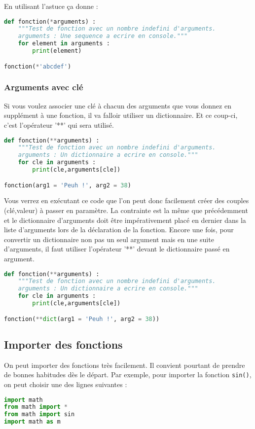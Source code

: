 \documentclass[a4paper,twoside]{article}
\begin{document}
En utilisant l'astuce  ça donne :
\begin{lstlisting}[language=python]
def fonction(*arguments) :
    """Test de fonction avec un nombre indefini d'arguments.
    arguments : Une sequence a ecrire en console."""
    for element in arguments :
        print(element)

fonction(*'abcdef')
\end{lstlisting}

\subsubsection{Arguments avec clé}

Si vous voulez associer une clé à chacun des arguments que vous donnez en supplément à une fonction, il va falloir utiliser un dictionnaire. Et ce coup-ci, c'est l'opérateur '**' qui sera utilisé.

\begin{lstlisting}[language=python]
def fonction(**arguments) :
    """Test de fonction avec un nombre indefini d'arguments.
    arguments : Un dictionnaire a ecrire en console."""
    for cle in arguments :
        print(cle,arguments[cle])

fonction(arg1 = 'Peuh !', arg2 = 38)
\end{lstlisting}

Vous verrez en exécutant ce code que l'on peut donc facilement créer des couples (clé,valeur) à passer en paramètre. La contrainte est la même que précédemment et le dictionnaire d'arguments doit être impérativement placé en dernier dans la liste d'arguments lors de la déclaration de la fonction. Encore une fois, pour convertir un dictionnaire non pas un seul argument mais en une suite d'arguments, il faut utiliser l'opérateur '**' devant le dictionnaire passé en argument.

\begin{lstlisting}[language=python]
def fonction(**arguments) :
    """Test de fonction avec un nombre indefini d'arguments.
    arguments : Un dictionnaire a ecrire en console."""
    for cle in arguments :
        print(cle,arguments[cle])

fonction(**dict(arg1 = 'Peuh !', arg2 = 38))
\end{lstlisting}

\subsection{Importer des fonctions}\label{sec:importer_fonctions}
On peut importer des fonctions très facilement. Il convient pourtant de prendre de bonnes habitudes dès le départ. Par exemple, pour importer la fonction \texttt{sin()}, on peut choisir une des lignes suivantes :
\begin{lstlisting}[language=python]
import math
from math import *
from math import sin
import math as m
\end{lstlisting}
\end{document}
